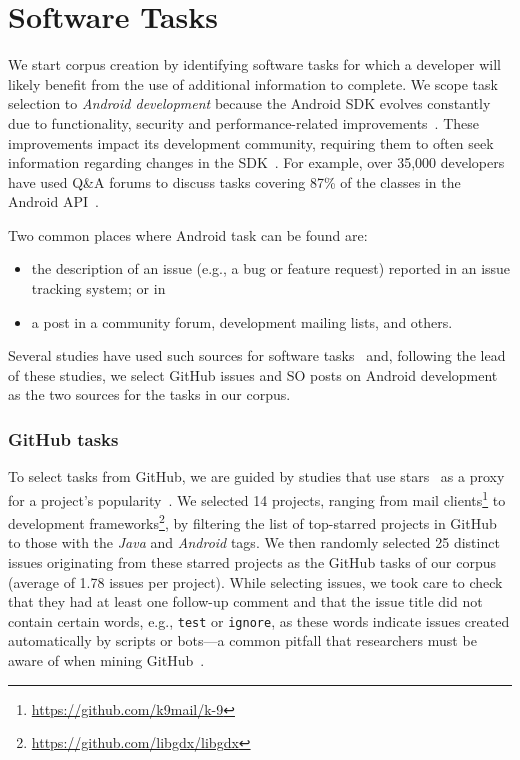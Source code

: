 \section{Software Tasks}
\label{cp4:corpus-tasks}

We start corpus creation by identifying software tasks 
for which a developer will likely benefit from 
the use of additional information to complete.
We scope task selection to \textit{Android development} 
because the 
Android \acf{SDK} evolves constantly due to 
functionality, security and performance-related improvements~\cite{Li2018android, Mateus2020}.
These improvements impact its development community, requiring them to often  seek information regarding changes in the SDK~\cite{linares2014, bavota2014b, mcdonnell2013}.
For example, over 35,000 developers have used Q\&A forums to discuss tasks covering 87\% of the classes in the Android API~\cite{parnin2012}.


Two common places where Android task can be found are:


\begin{itemize}
    \item the description of an issue
    (e.g., a bug or feature request) reported in an issue tracking system; or in
    \item a post in a community forum, development mailing lists, and others.
\end{itemize}

Several studies have used such sources for software tasks~\cite{Arya2019, baltes2019, nadi2020, Xu2017}
and, following the lead
of these studies, we select GitHub issues and \acf{SO} posts on Android development as 
the two sources for the tasks in our corpus.



\subsubsection{GitHub tasks}

To select tasks from GitHub, we are guided by studies that use 
stars~\cite{borges2016, borges2018}
as a proxy for a project's popularity~\cite{Ferreira2016, Xavier2020}.
We selected 14 projects,
ranging from mail clients\footnote{\url{https://github.com/k9mail/k-9}}
to development frameworks\footnote{\url{https://github.com/libgdx/libgdx}},
by filtering the list of top-starred projects in GitHub to those with the \textit{Java} and \textit{Android} tags.
We then randomly selected 25 distinct issues originating from these starred projects as the GitHub tasks of our corpus (average of 1.78 issues per project).
While selecting issues, we took care to check that they had at least one follow-up comment and that the issue title did not contain certain words, e.g., {\small \texttt{test}} or {\small  \texttt{ignore}},
as these words indicate issues  created automatically by scripts or bots---a common pitfall that researchers must be aware of when mining GitHub~\cite{kalliamvakou2014}.


